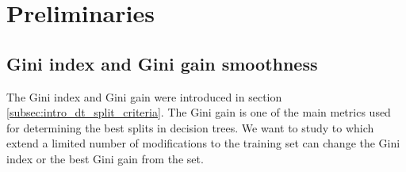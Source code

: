 \section{Preliminaries}
\subsection{Gini index and Gini gain smoothness}
The Gini index and Gini gain were introduced in section \ref{subsec:intro_dt_split_criteria}. The Gini gain is one of the main metrics used for determining the best splits in decision trees. We want to study to which extend a limited number of modifications to the training set can change the Gini index or the best Gini gain from the set. 

